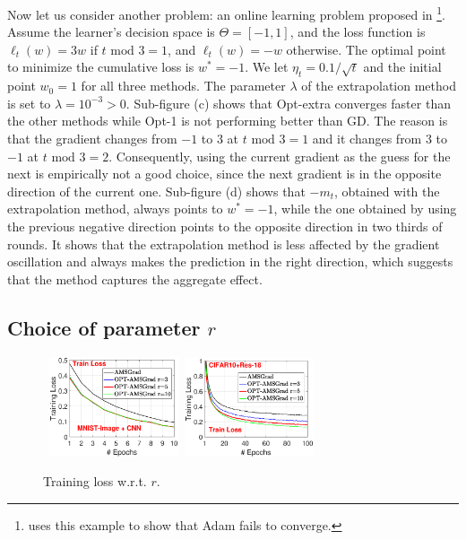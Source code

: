 \documentclass[wcp]{jmlr}
\begin{document}
Now let us consider another problem: an online learning problem proposed in \citet{RKK18}
\footnote{\citep{RKK18} uses this example to show that Adam \citep{KB15} fails to converge.}.
Assume the learner's decision space is $\Theta=[-1,1]$, and the loss function is $\ell_t(w) = 3 w$ if $t \text{ mod } 3 = 1$, and $\ell_t(w) = - w$ otherwise.
The optimal point to minimize the cumulative loss is $w^*=-1$.
We let $\eta_t=0.1 / \sqrt{t}$ and the initial point $w_0=1$ for all three methods.
The parameter $\lambda$ of the extrapolation method is set to $\lambda=10^{-3}>0$. 
Sub-figure (c) shows that Opt-extra converges faster than the other methods while Opt-1 is not performing better than GD.
The reason is that the gradient changes from $-1$ to $3$ at $t \text{ mod } 3 = 1$ and it changes from $3$ to $-1$ at $t \text{ mod } 3 = 2$.
Consequently, using the current gradient as the guess for the next is empirically not a good choice, since the next gradient is in the opposite direction of the current one.
Sub-figure (d) shows that $-m_t$, obtained with the extrapolation method, always points to $w^*=-1$, while the one obtained by using the previous negative direction points to the opposite direction in two thirds of rounds. 
It shows that the extrapolation method is less affected by the gradient oscillation and always makes the prediction in the right direction, which suggests that the method captures the aggregate effect.



\subsection{Choice of parameter $r$}\label{sec:choicer}



\begin{figure}\vspace{-0.4in}
\begin{center}
\mbox{
\includegraphics[width=1.5in]{new_figure/new_mnist_img_figure/mnist_img_train_loss_r3510_2.eps}\hspace{-0.1in}
\includegraphics[width=1.5in]{new_figure/cifar10_train_loss_r3510.eps}
}
\end{center}\vspace{-0.20in}
\caption{Training loss w.r.t. $r$.}\label{fig:compare}\vspace{-0.1in}
\end{figure}
\end{document}
